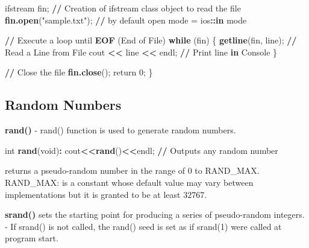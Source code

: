 \documentclass[
]{article}
\newenvironment{Shaded}{\begin{snugshade}}{\end{snugshade}}
\newcommand{\ControlFlowTok}[1]{\textcolor[rgb]{0.13,0.29,0.53}{\textbf{#1}}}
\newcommand{\DecValTok}[1]{\textcolor[rgb]{0.00,0.00,0.81}{#1}}
\newcommand{\ErrorTok}[1]{\textcolor[rgb]{0.64,0.00,0.00}{\textbf{#1}}}
\newcommand{\FunctionTok}[1]{\textcolor[rgb]{0.13,0.29,0.53}{\textbf{#1}}}
\newcommand{\NormalTok}[1]{#1}
\newcommand{\OtherTok}[1]{\textcolor[rgb]{0.56,0.35,0.01}{#1}}
\newcommand{\SpecialCharTok}[1]{\textcolor[rgb]{0.81,0.36,0.00}{\textbf{#1}}}
\newcommand{\StringTok}[1]{\textcolor[rgb]{0.31,0.60,0.02}{#1}}
\begin{document}
\begin{Shaded}
\begin{Highlighting}[]
    
\NormalTok{    ifstream fin; }\SpecialCharTok{/}\ErrorTok{/}\NormalTok{ Creation of ifstream class object to read the file }
    \FunctionTok{fin.open}\NormalTok{(}\StringTok{"sample.txt"}\NormalTok{);  }\SpecialCharTok{/}\ErrorTok{/}\NormalTok{ by default open mode }\OtherTok{=}\NormalTok{ ios}\SpecialCharTok{::}\ControlFlowTok{in}\NormalTok{ mode }
  
    \SpecialCharTok{/}\ErrorTok{/}\NormalTok{ Execute a loop until }\FunctionTok{EOF}\NormalTok{ (End of File) }
    \ControlFlowTok{while}\NormalTok{ (fin) \{ }
        \FunctionTok{getline}\NormalTok{(fin, line); }\SpecialCharTok{/}\ErrorTok{/}\NormalTok{ Read a Line from File}
\NormalTok{        cout }\SpecialCharTok{\textless{}}\ErrorTok{\textless{}}\NormalTok{ line }\SpecialCharTok{\textless{}}\ErrorTok{\textless{}}\NormalTok{ endl;  }\SpecialCharTok{/}\ErrorTok{/}\NormalTok{ Print line }\ControlFlowTok{in}\NormalTok{ Console }
\NormalTok{    \} }
  
    \SpecialCharTok{/}\ErrorTok{/}\NormalTok{ Close the file }
    \FunctionTok{fin.close}\NormalTok{(); }
\NormalTok{    return }\DecValTok{0}\NormalTok{;}
\NormalTok{\}}
\end{Highlighting}
\end{Shaded}

\subsection{Random Numbers}\label{random-numbers}

\textbf{rand()} - rand() function is used to generate random numbers.

\begin{Shaded}
\begin{Highlighting}[]
\NormalTok{int }\FunctionTok{rand}\NormalTok{(void)}\SpecialCharTok{:} 
\NormalTok{cout}\SpecialCharTok{\textless{}}\ErrorTok{\textless{}}\FunctionTok{rand}\NormalTok{()}\SpecialCharTok{\textless{}}\ErrorTok{\textless{}}\NormalTok{endl; }\SpecialCharTok{/}\ErrorTok{/}\NormalTok{ Outputs any random number}
\end{Highlighting}
\end{Shaded}

returns a pseudo-random number in the range of 0 to RAND\_MAX.
RAND\_MAX: is a constant whose default value may vary between
implementations but it is granted to be at least 32767.

\textbf{srand()} sets the starting point for producing a series of
pseudo-random integers. - If srand() is not called, the rand() seed is
set as if srand(1) were called at program start.
\end{document}
